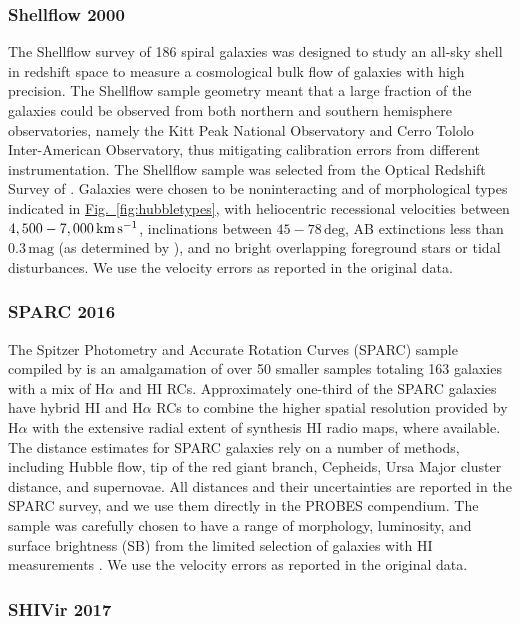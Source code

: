 \documentclass[twocolumn]{aastex631}
\newcommand{\Fig}[1]{{\protect\hyperref[fig:#1]{Fig.~\ref*{fig:#1}}}}
\newcommand{\HI}{H{\footnotesize I}\xspace}
\newcommand{\Ha}{H\ensuremath{\alpha}\xspace}
\newcommand{\wunits}[2]{\ensuremath{#1\,\text{#2}}}
\begin{document}
\subsubsection{Shellflow 2000}

The Shellflow survey \citep{Courteau2000} of 186 spiral galaxies was designed to study an all-sky shell in redshift space to measure a cosmological bulk flow of galaxies with high precision. 
The Shellflow sample geometry meant that a large fraction of the galaxies could be observed from both northern and southern hemisphere observatories, namely the Kitt Peak National Observatory and Cerro Tololo Inter-American Observatory, thus mitigating calibration errors from different instrumentation. 
The Shellflow sample was selected from the Optical Redshift Survey of \citet{Santiago1995}. 
Galaxies were chosen to be noninteracting and of morphological types indicated in \Fig{hubbletypes}, with heliocentric recessional velocities between \wunits{4,500 - 7,000}{km\,s$^{-1}$}, inclinations between \wunits{45 - 78}{deg}, AB extinctions less than \wunits{0.3}{mag} (as determined by \citealt{Burstein1982}), and no bright overlapping foreground stars or tidal disturbances.
We use the velocity errors as reported in the original data.

\subsubsection{SPARC 2016}\label{sec:sparc}

The Spitzer Photometry and Accurate Rotation Curves (SPARC) sample compiled by \citet{Lelli2016} is an amalgamation of over 50 smaller samples totaling 163 galaxies with a mix of \Ha and \HI RCs.
Approximately one-third of the SPARC galaxies have hybrid \HI and \Ha RCs to combine the higher spatial resolution provided by \Ha with the extensive radial extent of synthesis \HI radio maps, where available. 
The distance estimates for SPARC galaxies rely on a number of methods, including Hubble flow, tip of the red giant branch, Cepheids, Ursa Major cluster distance, and supernovae. 
All distances and their uncertainties are reported in the SPARC survey, and we use them directly in the PROBES compendium. 
The sample was carefully chosen to have a range of morphology, luminosity, and surface brightness (SB) from the limited selection of galaxies with \HI measurements \citep{Lelli2016}. 
We use the velocity errors as reported in the original data.

\subsubsection{SHIVir 2017}
\end{document}
